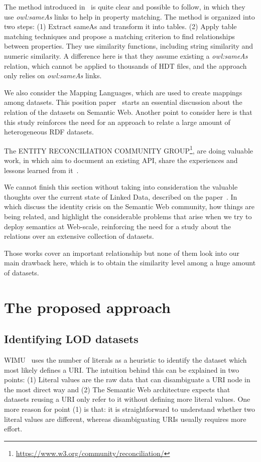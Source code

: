 \documentclass[sw]{iosart2x}
\begin{document}
The method introduced in~\cite{xie2018instance} is quite clear and possible to follow, in which they use \textit{owl:sameAs} links to help in property matching.
The method is organized into two steps:
(1) Extract sameAs and transform it into tables.
(2) Apply table matching techniques and propose a matching criterion to find relationships between properties.
They use similarity functions, including string similarity and numeric similarity.
A difference here is that they assume existing a \textit{owl:sameAs} relation, which cannot be applied to thousands of HDT files, and the approach only relies on \textit{owl:sameAs} links. 

We also consider the Mapping Languages, which are used to create mappings among datasets. This position paper~\cite{de2019mapping} starts an essential discussion about the relation of the datasets on Semantic Web. Another point to consider here is that this study reinforces the need for an approach to relate a large amount of heterogeneous RDF datasets.

The ENTITY RECONCILIATION COMMUNITY GROUP\footnote{\url{https://www.w3.org/community/reconciliation/}}, are doing valuable work, in which aim to document an existing API, share the experiences and lessons learned from it~\cite{DBLP:journals/corr/abs-1906-08092}.

We cannot finish this section without taking into consideration the valuable thoughts over the current state of Linked Data, described on the paper~\cite{verborgh_swj_2020}. In which discuss the identity crisis on the Semantic Web community, how things are being related, and highlight the considerable problems that arise when we try to deploy semantics at Web-scale, reinforcing the need for a study about the relations over an extensive collection of datasets.

Those works cover an important relationship but none of them look into our main drawback here, which is to obtain the similarity level among a huge amount of datasets.

\section{The proposed approach}
\label{sec:approach}

\subsection{Identifying LOD datasets}
WIMU~\cite{valdestilhas2018my} uses the number of literals as a heuristic to identify the dataset which most likely defines a URI.
The intuition behind this can be explained in two points: 
(1) Literal values are the raw data that can disambiguate a URI node in the most direct way and 
(2) The Semantic Web architecture expects that datasets reusing a URI only refer to it without defining more literal values. 
One more reason for point (1) is that: it is straightforward to understand whether two literal values are different, whereas disambiguating URIs usually requires more effort.
\end{document}
